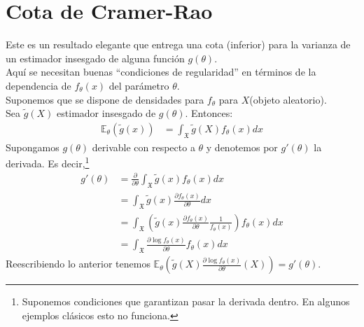 \documentclass[10pt]{article}
\theoremstyle{plain}
\theoremstyle{definition}
\begin{document}
\section{Cota de Cramer-Rao}
Este es un resultado elegante que entrega una cota (inferior) para la varianza de un estimador insesgado de alguna función $g(\theta)$.\\
Aquí se necesitan buenas ``condiciones de regularidad'' en términos de la dependencia de $f_{\theta}(x)$ del parámetro $\theta$.\\
Suponemos que se dispone de densidades para $f_{\theta}$ para $X$(objeto aleatorio).\\
Sea $\tilde{g}(X)$ estimador insesgado de $g(\theta)$. Entonces:
\begin{align*}
\mathbb{E}_{\theta}(\tilde{g}(x)) &= \int_{\mathfrak{X}}\tilde{g}(X)f_{\theta}(x) dx
\end{align*}
Supongamos $g(\theta)$ derivable con respecto a $\theta$ y denotemos por $g'(\theta)$ la derivada. Es decir,\footnote{Suponemos condiciones que garantizan pasar la derivada dentro. En algunos ejemplos clásicos esto no funciona.}
\begin{align*}
g'(\theta) &= \frac{\partial}{\partial \theta} \int_{\mathfrak{X}} \tilde{g}(x)f_{\theta}(x)dx\\
&= \int_{\mathfrak{X}}\tilde{g}(x) \frac{\partial f_{\theta}(x)}{\partial \theta} dx\\
&= \int_{\mathfrak{X}}\left(\tilde{g}(x) \frac{\partial f_{\theta}(x)}{\partial \theta}\frac{1}{f_{\theta}(x)}\right)f_{\theta}(x) dx\\
&= \int_{\mathfrak{X}}\frac{\partial \log f_{\theta}(x)}{\partial \theta} f_{\theta}(x) dx
\end{align*}
Reescribiendo lo anterior tenemos $\mathbb{E}_{\theta}\left(\tilde{g}(X)\frac{\partial \log f_{\theta}(x)}{\partial \theta}(X)\right) = g'(\theta)$.\\
\end{document}
